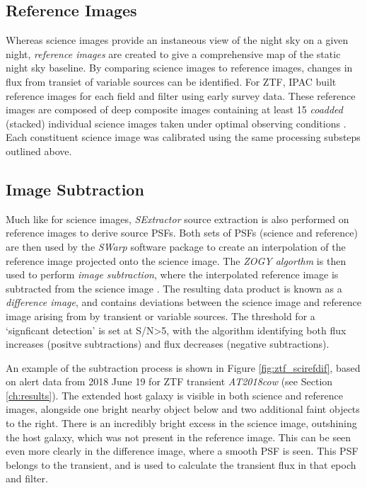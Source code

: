 \subsection*{Reference Images}

Whereas science images provide an instaneous view of the night sky on a given night, \emph{reference images} are created to give a comprehensive map of the static night sky baseline. By comparing science images to reference images, changes in flux from transiet of variable sources can be identified. For ZTF, IPAC built reference images for each field and filter using early survey data. These reference images are composed of deep composite images containing at least 15 \emph{coadded} (stacked) individual science images taken under optimal observing conditions \cite{ztf_data_processing}. Each constituent science image was calibrated using the same processing substeps outlined above.

\subsection*{Image Subtraction}

Much like for science images, \emph{SExtractor} source extraction is also performed on reference images to derive source PSFs. Both sets of PSFs (science and reference) are then used by the \emph{SWarp} software package  to create an interpolation of the reference image projected onto the science image. The \emph{ZOGY algorthm} is then used to perform \emph{image subtraction}, where the interpolated reference image is subtracted from the science image . The resulting data product is known as a \emph{difference image}, and contains deviations between the science image and reference image arising from by transient or variable sources. The threshold for a `signficant detection' is set at S/N>5, with the algorithm identifying both flux increases (positve subtractions) and flux decreases (negative subtractions). 

An example of the subtraction process is shown in Figure \ref{fig:ztf_scirefdif}, based on alert data from 2018 June 19 for ZTF transient \emph{AT2018cow} (see Section \ref{ch:results}). The extended host galaxy is visible in both science and reference images, alongside one bright nearby object below and two additional faint objects to the right. There is an incredibly bright excess in the science image, outshining the host galaxy, which was not present in the reference image. This can be seen even more clearly in the difference image, where a smooth PSF is seen. This PSF belongs to the transient, and is used to calculate the transient flux in that epoch and filter.

